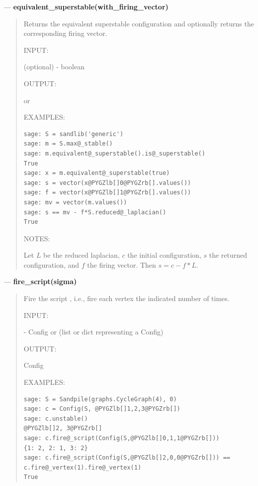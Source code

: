 \documentclass[letterpaper,10pt,english]{manual}
\begin{document}
---
\hypertarget{equivalent-superstable-with-firing-vector}{}
\textbf{equivalent\_superstable(with\_firing\_vector)}
\begin{quote}

Returns the equivalent superstable configuration and optionally
returns the corresponding firing vector.

INPUT:

 (optional) - boolean

OUTPUT:

 or 

EXAMPLES:

\begin{Verbatim}[commandchars=@\[\]]
sage: S = sandlib('generic')
sage: m = S.max@_stable()
sage: m.equivalent@_superstable().is@_superstable()
True
sage: x = m.equivalent@_superstable(true)
sage: s = vector(x@PYGZlb[]0@PYGZrb[].values())
sage: f = vector(x@PYGZlb[]1@PYGZrb[].values())
sage: mv = vector(m.values())
sage: s == mv - f*S.reduced@_laplacian()
True
\end{Verbatim}

NOTES:

Let $L$ be the reduced laplacian, $c$ the initial configuration, $s$ the
returned configuration, and $f$ the firing vector.  Then $s = c - f *
L$.
\end{quote}

---
\hypertarget{fire-script-sigma}{}
\textbf{fire\_script(sigma)}
\begin{quote}

Fire the script , i.e., fire each vertex the indicated number
of times.

INPUT:

 - Config or (list or dict representing a Config)

OUTPUT:

Config

EXAMPLES:

\begin{Verbatim}[commandchars=@\[\]]
sage: S = Sandpile(graphs.CycleGraph(4), 0)
sage: c = Config(S, @PYGZlb[]1,2,3@PYGZrb[])
sage: c.unstable()
@PYGZlb[]2, 3@PYGZrb[]
sage: c.fire@_script(Config(S,@PYGZlb[]0,1,1@PYGZrb[]))
{1: 2, 2: 1, 3: 2}
sage: c.fire@_script(Config(S,@PYGZlb[]2,0,0@PYGZrb[])) == c.fire@_vertex(1).fire@_vertex(1)
True
\end{Verbatim}
\end{quote}
\end{document}
